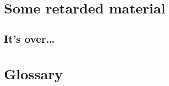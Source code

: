 \documentclass[12pt,mscthesis]{usiinfthesis}
\begin{document}
\chapter{Some retarded material}
\section{It's over\dots}
\lipsum 

\backmatter

\chapter{Glossary} %

%
%



\end{document}
